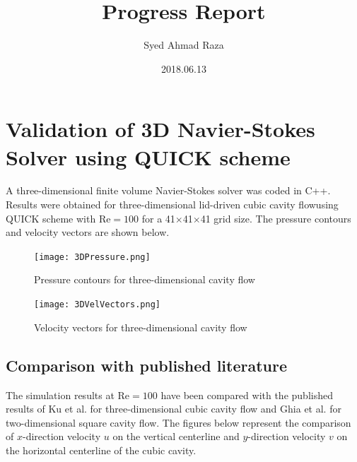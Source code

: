\documentclass[12pt,a4paper,fleqn]{article}
\title{Progress Report}
\author{Syed Ahmad Raza}
\date{2018.06.13}
\begin{document}
\maketitle

\section{Validation of 3D Navier-Stokes Solver using QUICK scheme}

A three-dimensional finite volume Navier-Stokes solver was coded in C++. Results were obtained for three-dimensional lid-driven cubic cavity flowusing QUICK scheme with \(\text{Re}=100\) for a 41\(\times\)41\(\times\)41 grid size. The pressure contours and velocity vectors are shown below.

\begin{figure}[H]
    \centering
    \texttt{[image: 3DPressure.png]}
    \caption{Pressure contours for three-dimensional cavity flow}
\end{figure}

\begin{figure}[H]
    \centering
    \texttt{[image: 3DVelVectors.png]}
    \caption{Velocity vectors for three-dimensional cavity flow}
\end{figure}

\subsection{Comparison with published literature}
The simulation results at \(\text{Re}=100\) have been compared with the published results of Ku et al. \cite{Ku:1987:PMS:33136.33145} for three-dimensional cubic cavity flow and Ghia et al. \cite{GHIA1982387} for two-dimensional square cavity flow. The figures below represent the comparison of \(x\)-direction velocity \(u\) on the vertical centerline and \(y\)-direction velocity \(v\) on the horizontal centerline of the cubic cavity.
\end{document}
